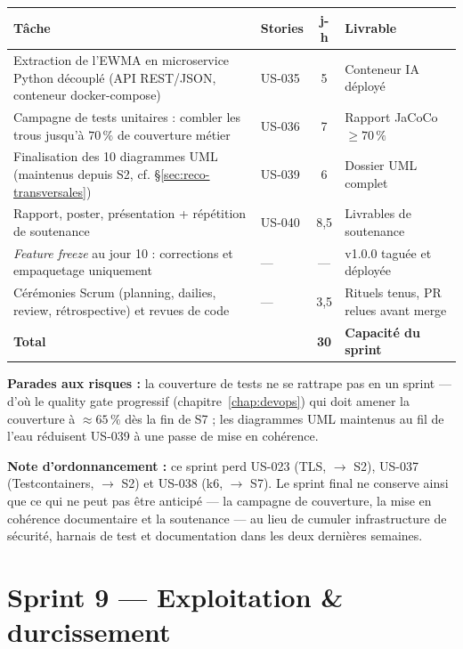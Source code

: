 \begin{center}
\small
\begin{tabular}{p{7.2cm}lcp{4.6cm}}
\toprule
\textbf{Tâche} & \textbf{Stories} & \textbf{j-h} & \textbf{Livrable} \\
\midrule
Extraction de l'EWMA en microservice Python découplé
(API REST/JSON, conteneur docker-compose) & US-035 & 5 & Conteneur IA déployé \\
Campagne de tests unitaires : combler les trous jusqu'à
$70\,\%$ de couverture métier & US-036 & 7 & Rapport JaCoCo $\geq 70\,\%$ \\
Finalisation des 10 diagrammes UML (maintenus depuis S2,
cf. §\ref{sec:reco-transversales}) & US-039 & 6 & Dossier UML complet \\
Rapport, poster, présentation + répétition de soutenance & US-040 & 8,5 & Livrables de soutenance \\
\emph{Feature freeze} au jour 10 : corrections et empaquetage uniquement & --- & --- & v1.0.0 taguée et déployée \\
\addlinespace
Cérémonies Scrum (planning, dailies, review, rétrospective) et
revues de code & --- & 3,5 & Rituels tenus, PR relues avant merge \\
\midrule
\textbf{Total} & & \textbf{30} & \textbf{Capacité du sprint} \\
\bottomrule
\end{tabular}
\end{center}

\textbf{Parades aux risques :} la couverture de tests ne se rattrape pas en
un sprint --- d'où le quality gate progressif (chapitre~\ref{chap:devops})
qui doit amener la couverture à $\approx 65\,\%$ dès la fin de S7 ; les
diagrammes UML maintenus au fil de l'eau réduisent US-039 à une passe de
mise en cohérence.

\textbf{Note d'ordonnancement :} ce sprint perd US-023 (TLS, $\rightarrow$
S2), US-037 (Testcontainers, $\rightarrow$ S2) et US-038 (k6, $\rightarrow$ S7).
Le sprint final ne conserve ainsi que ce qui ne peut pas être anticipé --- la
campagne de couverture, la mise en cohérence documentaire et la soutenance
--- au lieu de cumuler infrastructure de sécurité, harnais de test et
documentation dans les deux dernières semaines.

\section{Sprint 9 --- Exploitation \& durcissement}

